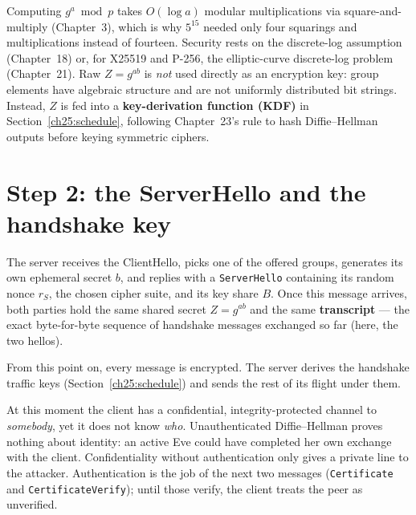 \begin{connectionbox}
Computing $g^a \bmod p$ takes $O(\log a)$ modular multiplications via
square-and-multiply (Chapter~3), which is why $5^{15}$ needed only four squarings
and multiplications instead of fourteen. Security rests on the discrete-log
assumption (Chapter~18) or, for X25519 and P-256, the elliptic-curve discrete-log
problem (Chapter~21). Raw $Z = g^{ab}$ is \emph{not} used directly as an encryption
key: group elements have algebraic structure and are not uniformly distributed bit
strings. Instead, $Z$ is fed into a \textbf{key-derivation function (KDF)} in
Section~\ref{ch25:schedule}, following Chapter~23's rule to hash Diffie--Hellman
outputs before keying symmetric ciphers.
\end{connectionbox}

\section{Step 2: the ServerHello and the handshake key}

The server receives the ClientHello, picks one of the offered groups, generates
its own ephemeral secret $b$, and replies with a \texttt{ServerHello} containing
its random nonce $r_S$, the chosen cipher suite, and its key share $B$. Once
this message arrives, both parties hold the same shared secret $Z = g^{ab}$
and the same \textbf{transcript} --- the exact byte-for-byte sequence of handshake
messages exchanged so far (here, the two hellos).

From this point on, every message is encrypted. The server derives the handshake
traffic keys (Section~\ref{ch25:schedule}) and sends the rest of its flight under
them.

\begin{trapbox}
At this moment the client has a confidential, integrity-protected channel to
\emph{somebody}, yet it does not know \emph{who}. Unauthenticated Diffie--Hellman
proves nothing about identity: an active Eve could have completed her own exchange
with the client. Confidentiality without authentication only gives a private line
to the attacker. Authentication is the job of the next two messages
(\texttt{Certificate} and \texttt{CertificateVerify}); until those verify, the
client treats the peer as unverified.
\end{trapbox}

